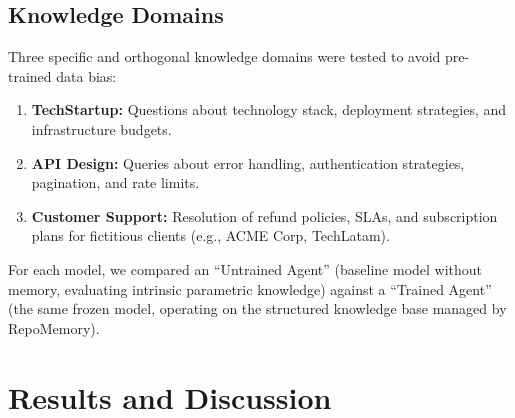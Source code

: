 \documentclass[conference]{IEEEtran}
\begin{document}
\subsection{Knowledge Domains}
Three specific and orthogonal knowledge domains were tested to avoid pre-trained data bias:
\begin{enumerate}
    \item \textbf{TechStartup:} Questions about technology stack, deployment strategies, and infrastructure budgets.
    \item \textbf{API Design:} Queries about error handling, authentication strategies, pagination, and rate limits.
    \item \textbf{Customer Support:} Resolution of refund policies, SLAs, and subscription plans for fictitious clients (e.g., ACME Corp, TechLatam).
\end{enumerate}
For each model, we compared an ``Untrained Agent'' (baseline model without memory, evaluating intrinsic parametric knowledge) against a ``Trained Agent'' (the same frozen model, operating on the structured knowledge base managed by RepoMemory).
\section{Results and Discussion}
\end{document}
